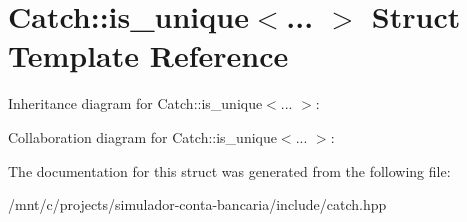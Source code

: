 \hypertarget{structCatch_1_1is__unique}{}\section{Catch\+:\+:is\+\_\+unique$<$... $>$ Struct Template Reference}
\label{structCatch_1_1is__unique}


Inheritance diagram for Catch\+:\+:is\+\_\+unique$<$... $>$\+:


Collaboration diagram for Catch\+:\+:is\+\_\+unique$<$... $>$\+:


The documentation for this struct was generated from the following file\+:\begin{DoxyCompactItemize}
\item 
/mnt/c/projects/simulador-\/conta-\/bancaria/include/catch.\+hpp\end{DoxyCompactItemize}
